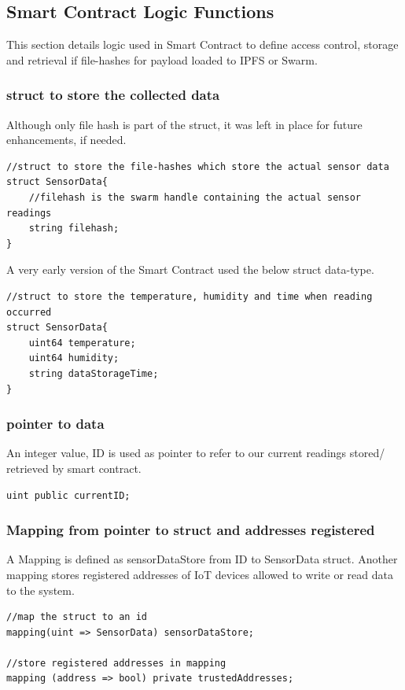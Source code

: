 \documentclass[11pt,openright]{report}
\begin{document}
\subsection{Smart Contract Logic Functions}
This section details logic used in Smart Contract to define access control, storage and retrieval if file-hashes for payload loaded to IPFS or Swarm. 

\subsubsection{struct to store the collected data}
Although only file hash is part of the struct, it was left in place for future enhancements, if needed.
\begin{verbatim}
//struct to store the file-hashes which store the actual sensor data
struct SensorData{
    //filehash is the swarm handle containing the actual sensor readings
    string filehash;
}
\end{verbatim}

A very early version of the Smart Contract used the below struct data-type.

\begin{verbatim}
//struct to store the temperature, humidity and time when reading occurred
struct SensorData{
    uint64 temperature;
    uint64 humidity;
    string dataStorageTime;
}
\end{verbatim}

\subsubsection{pointer to data}
An integer value, ID is used as pointer to refer to our current readings stored/ retrieved by smart contract.
\begin{verbatim}
uint public currentID;
\end{verbatim}

\subsubsection{Mapping from pointer to struct and addresses registered}
A Mapping is defined as sensorDataStore from ID to SensorData struct. Another mapping stores registered addresses of IoT devices allowed to write or read data to the system.
\begin{verbatim}
//map the struct to an id
mapping(uint => SensorData) sensorDataStore;

//store registered addresses in mapping
mapping (address => bool) private trustedAddresses;
\end{verbatim}
\end{document}
